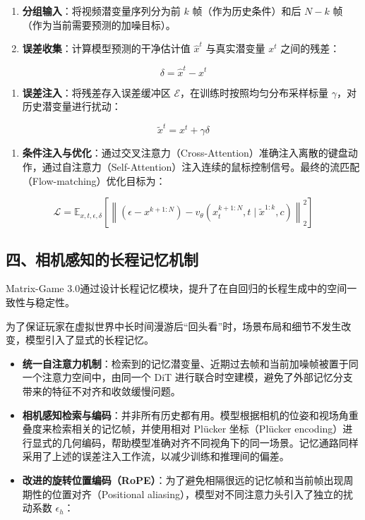\begin{enumerate}
\def\labelenumi{\arabic{enumi}.}
\item
  \textbf{分组输入}：将视频潜变量序列分为前 \(k\) 帧（作为历史条件）和后 \(N-k\) 帧（作为当前需要预测的加噪目标）。
\item
  \textbf{误差收集}：计算模型预测的干净估计值 \(\hat{x}^t\) 与真实潜变量 \(x^t\) 之间的残差：
\end{enumerate}

\[
\delta = \hat{x}^t - x^t
\]

\begin{enumerate}
\def\labelenumi{\arabic{enumi}.}
\setcounter{enumi}{2}
\tightlist
\item
  \textbf{误差注入}：将残差存入误差缓冲区 \(\mathcal{E}\)，在训练时按照均匀分布采样标量 \(\gamma\)，对历史潜变量进行扰动：
\end{enumerate}

\[
\tilde{x}^t = x^t + \gamma\delta
\]

\begin{enumerate}
\def\labelenumi{\arabic{enumi}.}
\setcounter{enumi}{3}
\tightlist
\item
  \textbf{条件注入与优化}：通过交叉注意力（Cross-Attention）准确注入离散的键盘动作，通过自注意力（Self-Attention）注入连续的鼠标控制信号。最终的流匹配（Flow-matching）优化目标为：
\end{enumerate}

\[
\mathcal{L} = \mathbb{E}_{x,t,\epsilon,\delta}\left[\left\|\left(\epsilon - x^{k+1:N}\right) - v_{\theta}\left(x_t^{k+1:N}, t\mid \tilde{x}^{1:k}, c\right)\right\|_2^2\right]
\]

\hypertarget{ux56dbux76f8ux673aux611fux77e5ux7684ux957fux7a0bux8bb0ux5fc6ux673aux5236}{%
\subsection{四、相机感知的长程记忆机制}\label{ux56dbux76f8ux673aux611fux77e5ux7684ux957fux7a0bux8bb0ux5fc6ux673aux5236}}

Matrix-Game 3.0通过设计长程记忆模块，提升了在自回归的长程生成中的空间一致性与稳定性。

为了保证玩家在虚拟世界中长时间漫游后``回头看''时，场景布局和细节不发生改变，模型引入了显式的长程记忆。

\begin{itemize}
\tightlist
\item
  \textbf{统一自注意力机制}：检索到的记忆潜变量、近期过去帧和当前加噪帧被置于同一个注意力空间中，由同一个 DiT 进行联合时空建模，避免了外部记忆分支带来的特征不对齐和收敛缓慢问题。
\item
  \textbf{相机感知检索与编码}：并非所有历史都有用。模型根据相机的位姿和视场角重叠度来检索相关的记忆帧，并使用相对 Plücker 坐标（Plücker encoding）进行显式的几何编码，帮助模型准确对齐不同视角下的同一场景。记忆通路同样采用了上述的误差注入工作流，以减少训练和推理间的偏差。
\item
  \textbf{改进的旋转位置编码（RoPE）}：为了避免相隔很远的记忆帧和当前帧出现周期性的位置对齐（Positional aliasing），模型对不同注意力头引入了独立的扰动系数 \(\epsilon_h\)：
\end{itemize}

